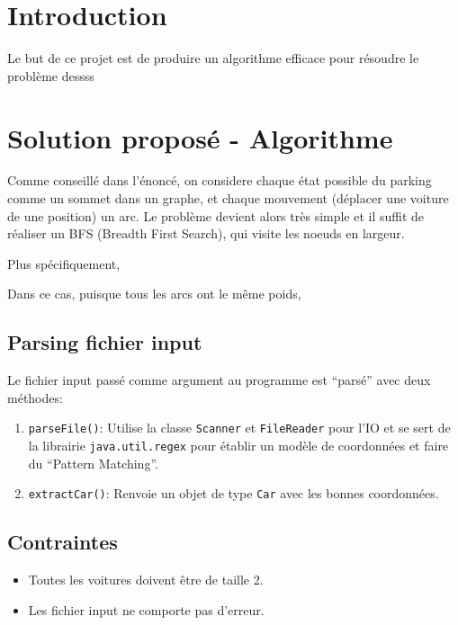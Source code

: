 \documentclass[11pt,a4paper]{article}
\begin{document}
\pagestyle{fancy}


\section{Introduction}

Le but de ce projet est de produire un algorithme efficace pour
résoudre le problème dessss

\section{Solution proposé - Algorithme}

Comme conseillé dans l'énoncé, on considere chaque état possible du
parking comme un sommet dans un graphe, et chaque mouvement (déplacer
une voiture de une position) un arc. Le problème devient alors très
simple et il suffit de réaliser un BFS (Breadth First Search), qui
visite les noeuds en largeur.

Plus spécifiquement,

Dans ce cas, puisque tous les arcs ont le même poids,


\subsection{Parsing fichier input}

Le fichier input passé comme argument au programme est ``parsé'' avec
deux méthodes:

\begin{enumerate}
\item \texttt{parseFile()}: Utilise la classe \texttt{Scanner} et
  \texttt{FileReader} pour l'IO et se sert de la librairie
  \texttt{java.util.regex} pour établir un modèle de coordonnées et
  faire du ``Pattern Matching''.
\item \texttt{extractCar()}: Renvoie un objet de type \texttt{Car}
  avec les bonnes coordonnées.
\end{enumerate}

\subsection{Contraintes}

\begin{itemize}
\item Toutes les voitures doivent être de taille 2.
\item Les fichier input ne comporte pas d'erreur.
\end{itemize}
\end{document}
